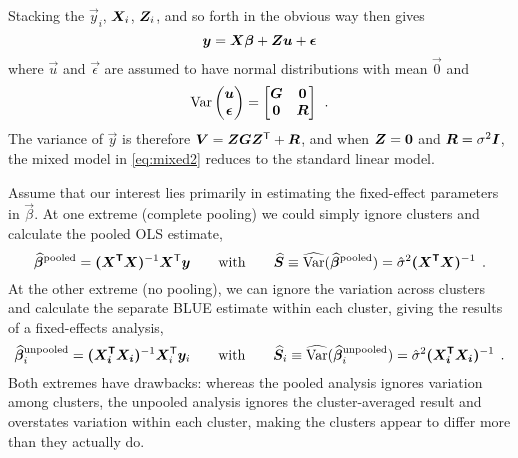 Stacking the $\vec{y}_i$, $\bm{X}_i$, $\bm{Z}_i$, and so forth in the obvious way then gives
\begin{equation}\label{eq:mixed2}
 \bm{y} = \bm{X} \bm{\beta} + \bm{Z} \bm{u} + \bm{\epsilon}
\end{equation}
where $\vec{u}$ and $\vec{\epsilon}$ are assumed to have normal distributions with mean $\vec{0}$
and
\begin{equation}\label{eq:mixed3}
 \mathrm{Var}
      \begin{pmatrix}
       \bm{u} \\ \bm{\epsilon}
      \end{pmatrix}
      =
      \begin{bmatrix}
      \bm{G} & \bm{0} \\ \bm{0} & \bm{R}
      \end{bmatrix} \:\: .
\end{equation}
The variance of $\vec{y}$ is therefore $\bm{V} = \bm{Z} \bm{G} \bm{Z}^\mathsf{T} + \bm{R}$, and when
$\bm{Z} = \bm{0}$ and $\bm{R} = \sigma^2 \bm{I}$, the mixed model in \eqref{eq:mixed2} reduces to the
standard linear model.

Assume that our interest lies primarily in estimating the fixed-effect parameters in $\vec{\beta}$.  At one extreme
(complete pooling) we could simply ignore clusters and calculate the pooled OLS estimate,
\begin{equation}\label{eq:mixed4}
 \widehat{\bm{\beta}}^{\textrm{pooled}} = \bm{(\bm{X}^\mathsf{T} \bm{X})}^{-1} \bm{X}^\mathsf{T} \bm{y}
 \quad\quad \textrm{with} \quad\quad
 \widehat{\bm{S}} \equiv \widehat{\mathrm{Var}}(\widehat{\bm{\beta}}^{\textrm{pooled}}) = \hat{\sigma}^2 \bm{(\bm{X}^\mathsf{T} \bm{X})}^{-1} \:\: .
\end{equation}
At the other extreme (no pooling), we can ignore the variation across clusters and calculate the
separate BLUE estimate within each cluster, giving the results of a fixed-effects analysis,
\begin{equation}\label{eq:mixed5}
 \widehat{\bm{\beta}}^{\textrm{unpooled}}_i = \bm{(\bm{X}_i^\mathsf{T} \bm{X}_i)}^{-1} \bm{X}_i^\mathsf{T} \bm{y}_i
 \quad\quad \textrm{with} \quad\quad
 \widehat{\bm{S}}_i \equiv \widehat{\mathrm{Var}}(\widehat{\bm{\beta}}^{\textrm{unpooled}}_i) = \hat{\sigma}^2 \bm{(\bm{X}_i^\mathsf{T} \bm{X}_i)}^{-1} \:\: .
\end{equation}
Both extremes have drawbacks:  whereas the pooled analysis ignores variation among clusters, the unpooled analysis ignores the
cluster-averaged result and overstates variation within each cluster, making the clusters appear to differ more than they actually do.

